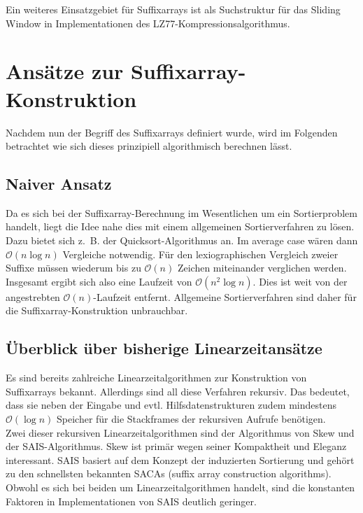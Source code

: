 \documentclass[twoside,11pt]{article}
\theoremstyle{break}
\begin{document}
Ein weiteres Einsatzgebiet für Suffixarrays ist als Suchstruktur für das Sliding Window in Implementationen des LZ77-Kompressionsalgorithmus.

\section{Ansätze zur Suffixarray-Konstruktion}

Nachdem nun der Begriff des Suffixarrays definiert wurde, wird im Folgenden betrachtet wie sich dieses prinzipiell algorithmisch berechnen lässt.

\subsection{Naiver Ansatz}

Da es sich bei der Suffixarray-Berechnung im Wesentlichen um ein Sortierproblem handelt, liegt die Idee nahe dies mit einem allgemeinen Sortierverfahren zu lösen. Dazu bietet sich z.~B. der Quicksort-Algorithmus an. Im average case wären dann $\mathcal{O}(n \log n)$ Vergleiche notwendig. Für den lexiographischen Vergleich zweier Suffixe müssen wiederum bis zu $\mathcal{O}(n)$ Zeichen miteinander verglichen werden. Insgesamt ergibt sich also eine Laufzeit von $\mathcal{O}(n^2 \log n)$. Dies ist weit von der angestrebten $\mathcal{O}(n)$-Laufzeit entfernt. Allgemeine Sortierverfahren sind daher für die Suffixarray-Konstruktion unbrauchbar.

\subsection{Überblick über bisherige Linearzeitansätze}

Es sind bereits zahlreiche Linearzeitalgorithmen zur Konstruktion von Suffixarrays bekannt. Allerdings sind all diese Verfahren rekursiv. Das bedeutet, dass sie neben der Eingabe und evtl. Hilfsdatenstrukturen zudem mindestens $\mathcal{O}(\log n)$ Speicher für die Stackframes der rekursiven Aufrufe benötigen.\\

Zwei dieser rekursiven Linearzeitalgorithmen sind der Algorithmus von Skew und der SAIS-Algorithmus. Skew ist primär wegen seiner Kompaktheit und Eleganz interessant. SAIS basiert auf dem Konzept der induzierten Sortierung und gehört zu den schnellsten bekannten SACAs (suffix array construction algorithms). Obwohl es sich bei beiden um Linearzeitalgorithmen handelt, sind die konstanten Faktoren in Implementationen von SAIS deutlich geringer.
\end{document}
